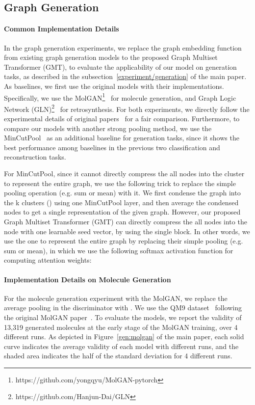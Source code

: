 \documentclass{article} \usepackage{iclr2021_conference,times}
\begin{document}
\subsection{Graph Generation \label{appendix/generation/experimentaldetail}}

\paragraph{Common Implementation Details}
In the graph generation experiments, we replace the graph embedding function  from existing graph generation models to the proposed Graph Multiset Transformer (GMT), to evaluate the applicability of our model on generation tasks, as described in the subsection~\ref{experiment/generation} of the main paper. As baselines, we first use the original models with their implementations. Specifically, we use the MolGAN\footnote{https://github.com/yongqyu/MolGAN-pytorch}~\citep{MolGAN} for molecule generation, and Graph Logic Network (GLN)\footnote{https://github.com/Hanjun-Dai/GLN}~\citep{GLN} for retrosynthesis. For both experiments, we directly follow the experimental details of original papers~\citep{MolGAN, GLN} for a fair comparison. Furthermore, to compare our models with another strong pooling method, we use the MinCutPool~\citep{MincutPool} as an additional baseline for generation tasks, since it shows the best performance among baselines in the previous two classification and reconstruction tasks.


For MinCutPool, since it cannot directly compress the all  nodes into the  cluster to represent the entire graph, we use the following trick to replace the simple pooling operation (e.g. sum or mean) with it. We first condense the graph into the k clusters () using one MinCutPool layer, and then average the condensed nodes to get a single representation of the given graph. However, our proposed Graph Multiset Transformer (GMT) can directly compress the all  nodes into the  node with one learnable seed vector, by using the single  block. In other words, we use the one  to represent the entire graph by replacing their simple pooling (e.g. sum or mean), in which we use the following softmax activation function for computing attention weights:



\paragraph{Implementation Details on Molecule Generation}
For the molecule generation experiment with the MolGAN, we replace the average pooling in the discriminator with . We use the QM9 dataset~\citep{qm9} following the original MolGAN paper~\citep{MolGAN}. To evaluate the models, we report the validity of 13,319 generated molecules at the early stage of the MolGAN training, over 4 different runs. As depicted in Figure~\ref{gen:molgan} of the main paper, each solid curve indicates the average validity of each model with  different runs, and the shaded area indicates the half of the standard deviation for 4 different runs.
\end{document}
